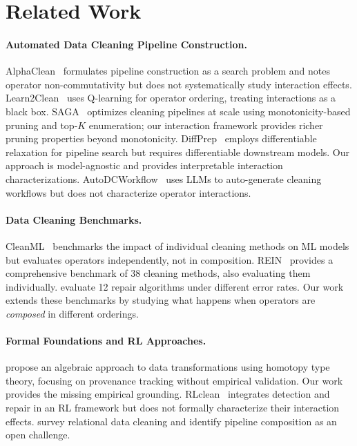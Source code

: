 \documentclass[preprint]{article}
\begin{document}
\section{Related Work}
\label{sec:related}

\paragraph{Automated Data Cleaning Pipeline Construction.}
AlphaClean~\citep{Krishnan2019AlphaClean} formulates pipeline construction as a search problem and notes operator non-commutativity but does not systematically study interaction effects. Learn2Clean~\citep{BertiEquille2019Learn2Clean} uses Q-learning for operator ordering, treating interactions as a black box. SAGA~\citep{Siddiqi2024SAGA} optimizes cleaning pipelines at scale using monotonicity-based pruning and top-$K$ enumeration; our interaction framework provides richer pruning properties beyond monotonicity. DiffPrep~\citep{Li2023DiffPrep} employs differentiable relaxation for pipeline search but requires differentiable downstream models. Our approach is model-agnostic and provides interpretable interaction characterizations. AutoDCWorkflow~\citep{Li2025AutoDCWorkflow} uses LLMs to auto-generate cleaning workflows but does not characterize operator interactions.

\paragraph{Data Cleaning Benchmarks.}
CleanML~\citep{Li2021CleanML} benchmarks the impact of individual cleaning methods on ML models but evaluates operators independently, not in composition. REIN~\citep{Abdelaal2023REIN} provides a comprehensive benchmark of 38 cleaning methods, also evaluating them individually. \citet{Ni2024AutomaticRepair} evaluate 12 repair algorithms under different error rates. Our work extends these benchmarks by studying what happens when operators are \emph{composed} in different orderings.

\paragraph{Formal Foundations and RL Approaches.}
\citet{NunezCorrales2020Algebraic} propose an algebraic approach to data transformations using homotopy type theory, focusing on provenance tracking without empirical validation. Our work provides the missing empirical grounding. RLclean~\citep{Peng2024RLclean} integrates detection and repair in an RL framework but does not formally characterize their interaction effects. \citet{Miao2024RelationalCleaning} survey relational data cleaning and identify pipeline composition as an open challenge.
\end{document}
